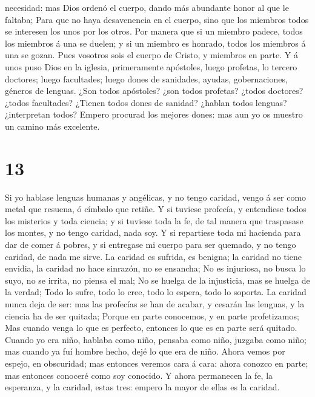 necesidad: mas Dios ordenó el cuerpo, dando más abundante honor al que
le faltaba;  Para que no haya desavenencia en el cuerpo,
sino que los miembros todos se interesen los unos por los otros.
 Por manera que si un miembro padece, todos los miembros á
una se duelen; y si un miembro es honrado, todos los miembros á una se
gozan.  Pues vosotros sois el cuerpo de Cristo, y miembros
en parte.  Y á unos puso Dios en la iglesia, primeramente
apóstoles, luego profetas, lo tercero doctores; luego facultades; luego
dones de sanidades, ayudas, gobernaciones, géneros de lenguas.
 ¿Son todos apóstoles? ¿son todos profetas? ¿todos
doctores? ¿todos facultades?  ¿Tienen todos dones de
sanidad? ¿hablan todos lenguas? ¿interpretan todos?  Empero
procurad los mejores dones: mas aun yo os muestro un camino más
excelente.

\hypertarget{section-12}{%
\section{13}\label{section-12}}

 Si yo hablase lenguas humanas y angélicas, y no tengo
caridad, vengo á ser como metal que resuena, ó címbalo que retiñe.
 Y si tuviese profecía, y entendiese todos los misterios y
toda ciencia; y si tuviese toda la fe, de tal manera que traspasase los
montes, y no tengo caridad, nada soy.  Y si repartiese toda
mi hacienda para dar de comer á pobres, y si entregase mi cuerpo para
ser quemado, y no tengo caridad, de nada me sirve.  La
caridad es sufrida, es benigna; la caridad no tiene envidia, la caridad
no hace sinrazón, no se ensancha;  No es injuriosa, no busca
lo suyo, no se irrita, no piensa el mal;  No se huelga de la
injusticia, mas se huelga de la verdad;  Todo lo sufre, todo
lo cree, todo lo espera, todo lo soporta.  La caridad nunca
deja de ser: mas las profecías se han de acabar, y cesarán las lenguas,
y la ciencia ha de ser quitada;  Porque en parte conocemos,
y en parte profetizamos;  Mas cuando venga lo que es
perfecto, entonces lo que es en parte será quitado.  Cuando
yo era niño, hablaba como niño, pensaba como niño, juzgaba como niño;
mas cuando ya fuí hombre hecho, dejé lo que era de niño. 
Ahora vemos por espejo, en obscuridad; mas entonces veremos cara á cara:
ahora conozco en parte; mas entonces conoceré como soy conocido.
 Y ahora permanecen la fe, la esperanza, y la caridad,
estas tres: empero la mayor de ellas es la caridad.


